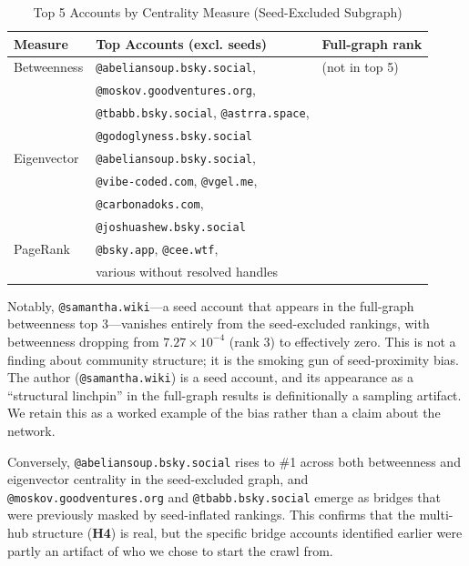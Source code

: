 \documentclass[11pt,a4paper]{article}
\begin{document}
\begin{table}[H]
    \centering
    \caption{Top 5 Accounts by Centrality Measure (Seed-Excluded Subgraph)}
    \label{tab:centralities}
    \begin{tabular}{lll}
        \toprule
        Measure & Top Accounts (excl. seeds) & Full-graph rank \\
        \midrule
        Betweenness & \texttt{@abeliansoup.bsky.social}, & (not in top 5) \\
                    & \texttt{@moskov.goodventures.org}, & \\
                    & \texttt{@tbabb.bsky.social}, \texttt{@astrra.space}, & \\
                    & \texttt{@godoglyness.bsky.social} & \\
        \addlinespace
        Eigenvector  & \texttt{@abeliansoup.bsky.social}, & \\
                     & \texttt{@vibe-coded.com}, \texttt{@vgel.me}, & \\
                     & \texttt{@carbonadoks.com}, & \\
                     & \texttt{@joshuashew.bsky.social} & \\
        \addlinespace
        PageRank     & \texttt{@bsky.app}, \texttt{@cee.wtf}, & \\
                     & various without resolved handles & \\
        \bottomrule
    \end{tabular}
\end{table}

Notably, \texttt{@samantha.wiki}---a seed account that appears in the full-graph betweenness top 3---vanishes entirely from the seed-excluded rankings, with betweenness dropping from $7.27 \times 10^{-4}$ (rank 3) to effectively zero. This is not a finding about community structure; it is the smoking gun of seed-proximity bias. The author (\texttt{@samantha.wiki}) is a seed account, and its appearance as a ``structural linchpin'' in the full-graph results is definitionally a sampling artifact. We retain this as a worked example of the bias rather than a claim about the network.

Conversely, \texttt{@abeliansoup.bsky.social} rises to \#1 across both betweenness and eigenvector centrality in the seed-excluded graph, and \texttt{@moskov.goodventures.org} and \texttt{@tbabb.bsky.social} emerge as bridges that were previously masked by seed-inflated rankings. This confirms that the multi-hub structure (\textbf{H4}) is real, but the specific bridge accounts identified earlier were partly an artifact of who we chose to start the crawl from.
\end{document}

